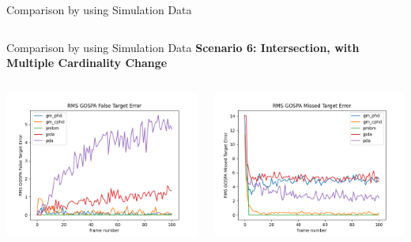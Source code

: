 \documentclass[12pt]{beamer}
\begin{document}
\begin{frame}{Comparison by using Simulation Data}
\begin{columns}[t]
\begin{column}{0.5\linewidth}
  \end{column}
\end{columns}
\end{frame}

\begin{frame}{Comparison by using Simulation Data}
\textbf{Scenario 6: Intersection, with Multiple Cardinality Change}
\begin{columns}[t]
  \begin{column}{0.5\linewidth}
      \centering
      \includegraphics[width=\linewidth,height=\textheight,keepaspectratio]{real_data/scenario1/gospa_false.png}\\
  \end{column}
    \begin{column}{0.5\linewidth}
      \centering
      \includegraphics[width=\linewidth,height=\textheight,keepaspectratio]{real_data/scenario1/missed.png}\\
  \end{column}
\end{columns}
\end{frame}
\end{document}
